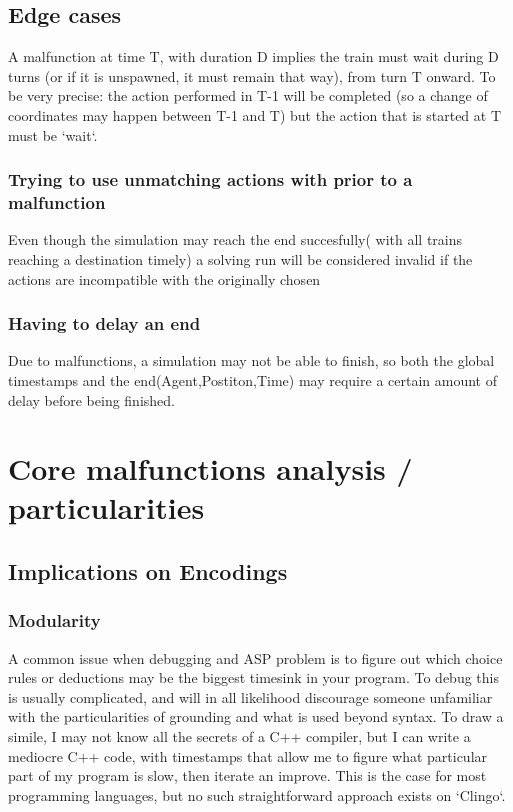 \subsection{Edge cases}
A malfunction at time T, with duration D implies the train must wait during D turns (or if it is unspawned, it must remain that way), from turn T onward. To be very precise: the action performed in T-1 will be completed (so a change of coordinates may happen between T-1 and T) but the action that is started at T must be `wait`.

\subsubsection {Trying to use unmatching actions with prior to a malfunction} Even though the simulation may reach the end succesfully( with all trains reaching a destination timely) a solving run will be considered invalid if the actions are incompatible with the originally chosen

\subsubsection {Having to delay an end} Due to malfunctions, a simulation may not be able to finish, so both the global timestamps and the end(Agent,Postiton,Time) may require a certain amount of delay before being finished.

\section{Core malfunctions analysis / particularities}
\subsection{Implications on Encodings}

\subsubsection{Modularity}
A common issue when debugging and ASP problem is to figure out which choice rules or deductions may be the biggest timesink in your program. To debug this is usually complicated, and will in all likelihood discourage someone unfamiliar with the particularities of grounding and what is used beyond syntax. To draw a simile, I may not know all the secrets of a C++ compiler, but I can write a mediocre C++ code, with timestamps that allow me to figure what particular part of my program is slow, then iterate an improve. This is the case for most programming languages, but no such straightforward approach exists on `Clingo`.

